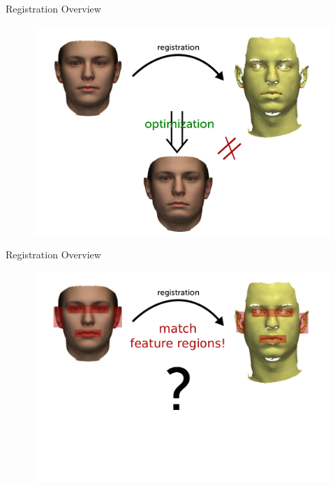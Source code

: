\documentclass[xcolor=x11names,compress]{beamer}
\begin{document}
    \begin{frame}{Registration Overview}
        \begin{figure}
            \includegraphics[width=\textwidth]{../resources/figures/intro6.pdf}
        \end{figure}
    \end{frame}

    \begin{frame}{Registration Overview}
        \begin{figure}
            \includegraphics[width=\textwidth]{../resources/figures/intro7.pdf}
        \end{figure}
    \end{frame}
\end{document}
